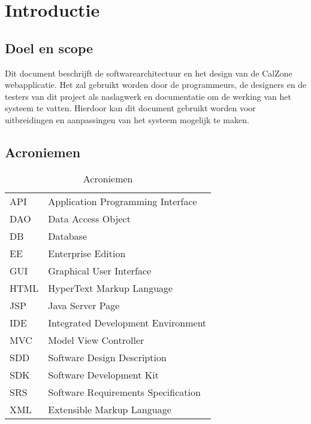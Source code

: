 \chapter{Introductie}

\section{Doel en scope}
Dit document beschrijft de softwarearchitectuur en het design van de CalZone webapplicatie.
Het zal gebruikt worden door de programmeurs, de designers en de testers van dit project als naslagwerk en documentatie om de werking van het systeem te vatten. 
Hierdoor kan dit document gebruikt worden voor uitbreidingen en aanpassingen van het systeem mogelijk te maken.


\section{Acroniemen}

\begin{table}[H]
	\centering
	\caption{Acroniemen}
	\label{tab:Acroniemen}
	\begin{tabular}{l | l}
	
	API	& Application Programming Interface\\
	
	DAO	& Data Access Object\\

	DB	& Database\\
	
	EE	& Enterprise Edition\\

	GUI	& Graphical User Interface\\
	
	HTML	& HyperText Markup Language\\

	JSP & Java Server Page\\
	
	IDE	& Integrated Development Environment\\

	MVC & Model View Controller\\ 

	SDD	& Software Design Description\\

	SDK	& Software Development Kit\\

	SRS	& Software Requirements Specification\\
	
	XML & Extensible Markup Language\\
	
	\end{tabular}
\end{table}


